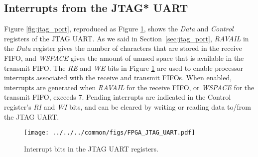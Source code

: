 \subsection{Interrupts from the JTAG* UART}

Figure \ref{fig:jtag_port}, reproduced as Figure \ref{fig:jtag_port_int}, shows the {\it Data} 
and {\it Control} registers of the JTAG UART. As we said in Section~\ref{sec:jtag_port}, 
{\it RAVAIL} in the {\it Data} register gives the number of characters that 
are stored in the receive 
FIFO, and {\it WSPACE} gives the amount of unused space that is available in the transmit FIFO. 
The {\it RE} and {\it WE} bits in Figure \ref{fig:jtag_port_int}
are used to enable processor interrupts associated with the receive and transmit FIFOs. 
When enabled, interrupts are generated when {\it RAVAIL} for the receive FIFO, 
or {\it WSPACE} for the transmit FIFO, exceeds 7. Pending interrupts are indicated in the 
Control register's {\it RI} and {\it WI} bits, and can be cleared by writing or reading data
to/from the JTAG UART.

\begin{figure}[h!]
   \begin{center}
       \texttt{[image: ../../../common/figs/FPGA\_JTAG\_UART.pdf]}
   \end{center}
   \caption{Interrupt bits in the JTAG UART registers.}
	\label{fig:jtag_port_int}
\end{figure}


